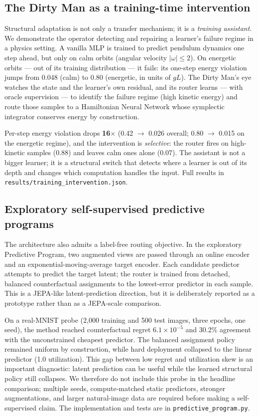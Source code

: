 \documentclass[11pt,a4paper]{article}
\begin{document}
\subsection{The Dirty Man as a training-time intervention}
\label{sec:intervention}

Structural adaptation is not only a transfer mechanism; it is a \emph{training
assistant}. We demonstrate the operator detecting and repairing a learner's
failure regime in a physics setting. A vanilla MLP is trained to predict
pendulum dynamics one step ahead, but only on calm orbits (angular velocity
$|\omega|\le 2$). On energetic orbits --- out of its training distribution ---
it fails: its one-step energy violation jumps from 0.048 (calm) to 0.80
(energetic, in units of $gL$). The Dirty Man's eye watches the state and the
learner's own residual, and its router learns --- with oracle supervision ---
to identify the failure regime (high kinetic energy) and route those samples
to a Hamiltonian Neural Network whose symplectic integrator conserves energy
by construction.

Per-step energy violation drops \textbf{16$\times$} (0.42 $\to$ 0.026 overall;
0.80 $\to$ 0.015 on the energetic regime), and the intervention is \emph{selective}:
the router fires on high-kinetic samples (0.88) and leaves calm ones alone
(0.07). The assistant is not a bigger learner; it is a structural switch that
detects where a learner is out of its depth and changes which computation
handles the input. Full results in
\texttt{results/training\_intervention.json}.

\subsection{Exploratory self-supervised predictive programs}
\label{sec:predictive}

The architecture also admits a label-free routing objective. In the exploratory
Predictive Program, two augmented views are passed through an online encoder
and an exponential-moving-average target encoder. Each candidate predictor
attempts to predict the target latent; the router is trained from detached,
balanced counterfactual assignments to the lowest-error predictor in each
sample. This is a JEPA-like latent-prediction direction, but it is deliberately
reported as a prototype rather than as a JEPA-scale comparison.

On a real-MNIST probe (2{,}000 training and 500 test images, three epochs, one
seed), the method reached counterfactual regret $6.1\times10^{-5}$ and 30.2\%
agreement with the unconstrained cheapest predictor. The balanced assignment
policy remained uniform by construction, while hard deployment collapsed to
the linear predictor (1.0 utilization).
This gap between low regret and utilization skew is an important diagnostic:
latent prediction can be useful while the learned structural policy still
collapses. We therefore do not include this probe in the headline comparison;
multiple seeds, compute-matched static predictors, stronger augmentations, and
larger natural-image data are required before making a self-supervised claim.
The implementation and tests are in \texttt{predictive\_program.py}.
\end{document}
